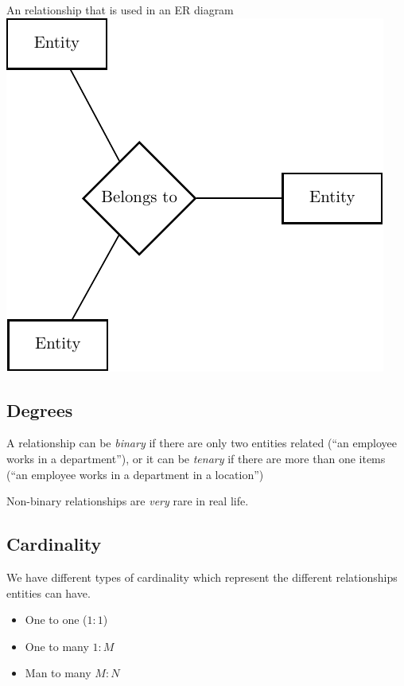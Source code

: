 \begin{highlight}{An relationship that is used in an ER diagram}
    \includegraphics{lualatex/dsr/3/relationships.pdf}
\end{highlight}

\subsection{Degrees}\label{sub:degrees}

A relationship can be \emph{binary} if there are only two entities related (``an employee works in a department''), or it can be \emph{tenary} if there are more than one items (``an employee works in a department in a location'')

\begin{note}
    Non-binary relationships are \emph{very} rare in real life.
\end{note}

\subsection{Cardinality}\label{sub:cardinality}

We have different types of cardinality which represent the different relationships entities can have.
\begin{itemize}
    \item One to one (\(1:1\))
    \item One to many \(1:M\)
    \item Man to many \(M:N\)
\end{itemize}

